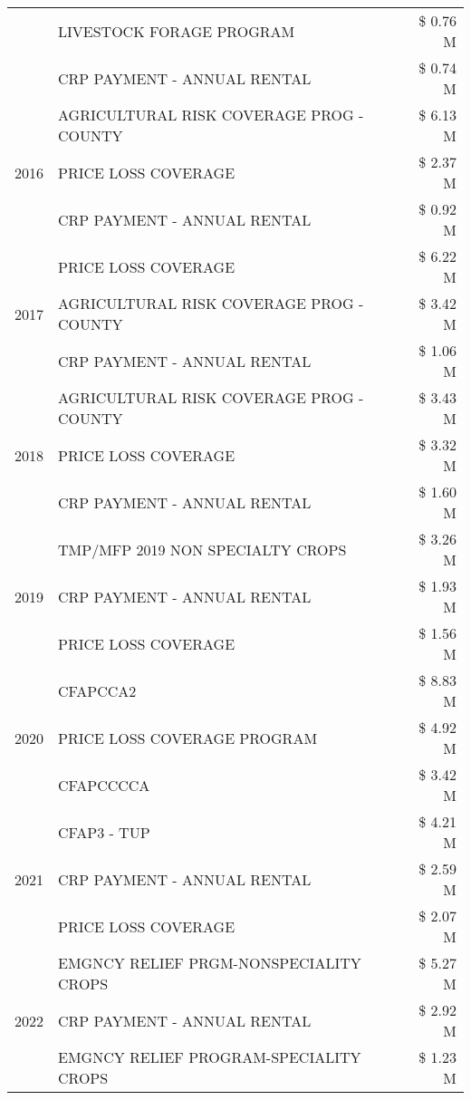 \begin{tabular}{llr}
 & LIVESTOCK FORAGE PROGRAM & \$ 0.76 M \\
 & CRP PAYMENT - ANNUAL RENTAL & \$ 0.74 M \\
\cline{1-3}
\multirow[t]{3}{*}{2016} & AGRICULTURAL RISK COVERAGE PROG - COUNTY & \$ 6.13 M \\
 & PRICE LOSS COVERAGE & \$ 2.37 M \\
 & CRP PAYMENT - ANNUAL RENTAL & \$ 0.92 M \\
\cline{1-3}
\multirow[t]{3}{*}{2017} & PRICE LOSS COVERAGE & \$ 6.22 M \\
 & AGRICULTURAL RISK COVERAGE PROG - COUNTY & \$ 3.42 M \\
 & CRP PAYMENT - ANNUAL RENTAL & \$ 1.06 M \\
\cline{1-3}
\multirow[t]{3}{*}{2018} & AGRICULTURAL RISK COVERAGE PROG - COUNTY & \$ 3.43 M \\
 & PRICE LOSS COVERAGE & \$ 3.32 M \\
 & CRP PAYMENT - ANNUAL RENTAL & \$ 1.60 M \\
\cline{1-3}
\multirow[t]{3}{*}{2019} & TMP/MFP 2019 NON SPECIALTY CROPS & \$ 3.26 M \\
 & CRP PAYMENT - ANNUAL RENTAL & \$ 1.93 M \\
 & PRICE LOSS COVERAGE & \$ 1.56 M \\
\cline{1-3}
\multirow[t]{3}{*}{2020} & CFAPCCA2 & \$ 8.83 M \\
 & PRICE LOSS COVERAGE PROGRAM & \$ 4.92 M \\
 & CFAPCCCCA & \$ 3.42 M \\
\cline{1-3}
\multirow[t]{3}{*}{2021} & CFAP3 - TUP & \$ 4.21 M \\
 & CRP PAYMENT - ANNUAL RENTAL & \$ 2.59 M \\
 & PRICE LOSS COVERAGE & \$ 2.07 M \\
\cline{1-3}
\multirow[t]{3}{*}{2022} & EMGNCY RELIEF PRGM-NONSPECIALITY CROPS & \$ 5.27 M \\
 & CRP PAYMENT - ANNUAL RENTAL & \$ 2.92 M \\
 & EMGNCY RELIEF PROGRAM-SPECIALITY CROPS & \$ 1.23 M \\
\cline{1-3}
\bottomrule
\end{tabular}
